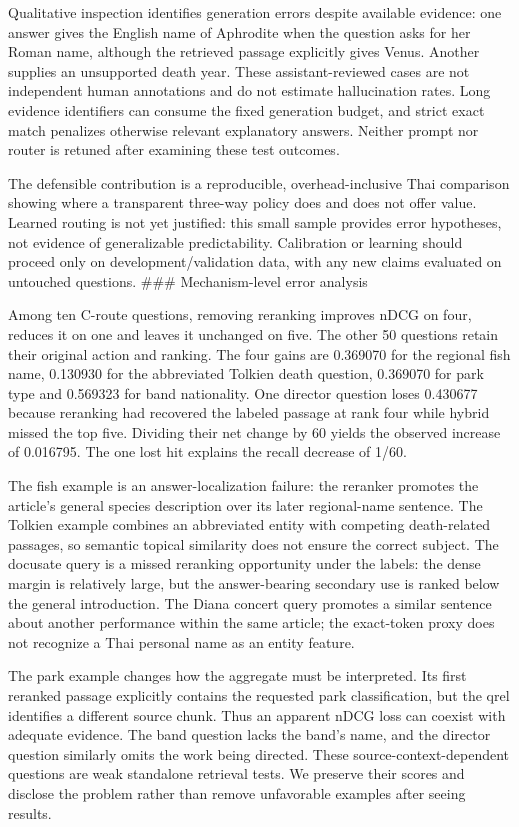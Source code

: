 \documentclass[10pt,a4paper]{article}
\begin{document}
Qualitative inspection identifies generation errors despite available
evidence: one answer gives the English name of Aphrodite when the
question asks for her Roman name, although the retrieved passage
explicitly gives Venus. Another supplies an unsupported death year.
These assistant-reviewed cases are not independent human annotations and
do not estimate hallucination rates. Long evidence identifiers can
consume the fixed generation budget, and strict exact match penalizes
otherwise relevant explanatory answers. Neither prompt nor router is
retuned after examining these test outcomes.

The defensible contribution is a reproducible, overhead-inclusive Thai
comparison showing where a transparent three-way policy does and does
not offer value. Learned routing is not yet justified: this small sample
provides error hypotheses, not evidence of generalizable predictability.
Calibration or learning should proceed only on development/validation
data, with any new claims evaluated on untouched questions. \#\#\#
Mechanism-level error analysis

Among ten C-route questions, removing reranking improves nDCG on four,
reduces it on one and leaves it unchanged on five. The other 50
questions retain their original action and ranking. The four gains are
0.369070 for the regional fish name, 0.130930 for the abbreviated
Tolkien death question, 0.369070 for park type and 0.569323 for band
nationality. One director question loses 0.430677 because reranking had
recovered the labeled passage at rank four while hybrid missed the top
five. Dividing their net change by 60 yields the observed increase of
0.016795. The one lost hit explains the recall decrease of 1/60.

The fish example is an answer-localization failure: the reranker
promotes the article's general species description over its later
regional-name sentence. The Tolkien example combines an abbreviated
entity with competing death-related passages, so semantic topical
similarity does not ensure the correct subject. The docusate query is a
missed reranking opportunity under the labels: the dense margin is
relatively large, but the answer-bearing secondary use is ranked below
the general introduction. The Diana concert query promotes a similar
sentence about another performance within the same article; the
exact-token proxy does not recognize a Thai personal name as an entity
feature.

The park example changes how the aggregate must be interpreted. Its
first reranked passage explicitly contains the requested park
classification, but the qrel identifies a different source chunk. Thus
an apparent nDCG loss can coexist with adequate evidence. The band
question lacks the band's name, and the director question similarly
omits the work being directed. These source-context-dependent questions
are weak standalone retrieval tests. We preserve their scores and
disclose the problem rather than remove unfavorable examples after
seeing results.
\end{document}

